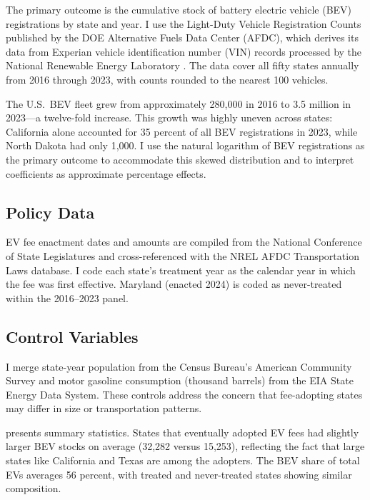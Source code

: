 \documentclass[12pt]{article}
\begin{document}
The primary outcome is the cumulative stock of battery electric vehicle (BEV) registrations by state and year. I use the Light-Duty Vehicle Registration Counts published by the DOE Alternative Fuels Data Center (AFDC), which derives its data from Experian vehicle identification number (VIN) records processed by the National Renewable Energy Laboratory \citep{afdc2024}. The data cover all fifty states annually from 2016 through 2023, with counts rounded to the nearest 100 vehicles.

The U.S.\ BEV fleet grew from approximately 280,000 in 2016 to 3.5 million in 2023---a twelve-fold increase. This growth was highly uneven across states: California alone accounted for 35 percent of all BEV registrations in 2023, while North Dakota had only 1,000. I use the natural logarithm of BEV registrations as the primary outcome to accommodate this skewed distribution and to interpret coefficients as approximate percentage effects.

\subsection{Policy Data}

EV fee enactment dates and amounts are compiled from the National Conference of State Legislatures \citep{ncsl2024} and cross-referenced with the NREL AFDC Transportation Laws database. I code each state's treatment year as the calendar year in which the fee was first effective. Maryland (enacted 2024) is coded as never-treated within the 2016--2023 panel.

\subsection{Control Variables}

I merge state-year population from the Census Bureau's American Community Survey and motor gasoline consumption (thousand barrels) from the EIA State Energy Data System. These controls address the concern that fee-adopting states may differ in size or transportation patterns.



 presents summary statistics. States that eventually adopted EV fees had slightly larger BEV stocks on average (32,282 versus 15,253), reflecting the fact that large states like California and Texas are among the adopters. The BEV share of total EVs averages 56 percent, with treated and never-treated states showing similar composition.
\end{document}
